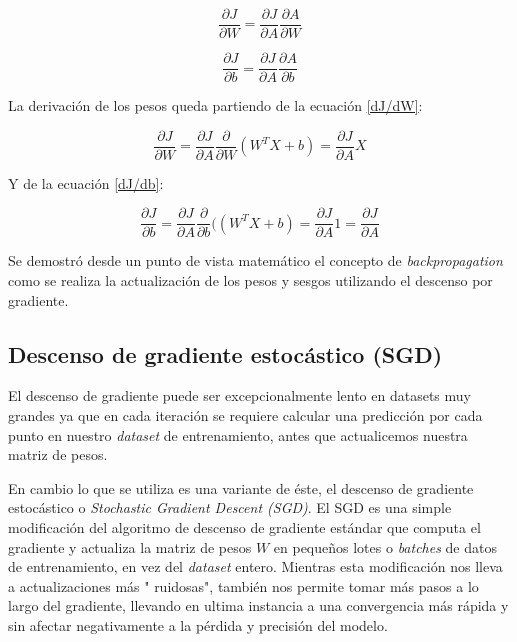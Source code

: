 \documentclass[a4paper,12pt]{article}
\begin{document}
\begin{equation}
\frac{\partial J}{\partial W} = \frac{\partial J}{\partial A} \frac{\partial A}{\partial W}
\label{dJ/dW}
\end{equation}

\begin{equation}
\frac{\partial J}{\partial b} = \frac{\partial J}{\partial A} \frac{\partial A}{\partial b}
\label{dJ/db}
\end{equation}

La derivación de los pesos queda partiendo de la ecuación \ref{dJ/dW}:

\begin{equation}
\frac{\partial J}{\partial W} = \frac{\partial J}{\partial A} \frac{\partial}{\partial W}(W^T X + b) = \frac{\partial J}{\partial A} X
\end{equation}

Y de la ecuación \ref{dJ/db}:

\begin{equation}
\frac{\partial J}{\partial b} = \frac{\partial J}{\partial A} \frac{\partial}{\partial b}((W^T X + b) = \frac{\partial J}{\partial A} 1 = \frac{\partial J}{\partial A}
\end{equation}

Se demostró desde un punto de vista matemático el concepto de \textit{backpropagation} como se realiza la actualización de los pesos y sesgos utilizando el descenso por gradiente.

\subsection{Descenso de gradiente estocástico (SGD)}
El descenso de gradiente puede ser excepcionalmente lento en datasets muy grandes ya que en cada iteración se requiere calcular una predicción por cada punto en nuestro \textit{dataset} de entrenamiento, antes que actualicemos nuestra matriz de pesos.

En cambio lo que se utiliza es una variante de éste, el descenso de gradiente estocástico o \textit{Stochastic Gradient Descent (SGD)}.
El SGD es una simple modificación del algoritmo de descenso de gradiente estándar que computa el gradiente y actualiza la matriz de pesos $W$ en pequeños lotes o \textit{batches} de datos de entrenamiento, en vez del \textit{dataset} entero. Mientras esta modificación nos lleva a actualizaciones más " ruidosas", también nos permite tomar más pasos a lo largo del gradiente, llevando en ultima instancia a una convergencia más rápida y sin afectar negativamente a la pérdida y precisión del modelo.
\end{document}
